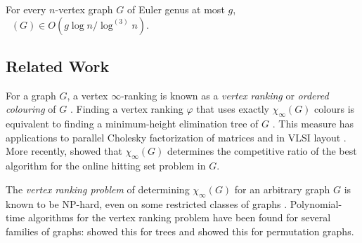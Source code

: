 \documentclass[kpfonts]{patmorin}
\DeclareMathOperator{\trn}{\chi_2}
\theoremstyle{named}
\begin{document}
\begin{thm}\label{bounded-genus}
    For every $n$-vertex graph $G$ of Euler genus at most $g$, $\trn(G)\in O(g\log n/\log^{(3)} n)$.
\end{thm}




\subsection{Related Work}

For a graph $G$, a vertex $\infty$-ranking is known as a \emph{vertex ranking} \cite{bodlaender.deogun.ea:rankings} or \emph{ordered colouring} of $G$ \cite{katchalski.mccuaig.ea:ordered}.  Finding a vertex ranking $\varphi$ that uses exactly $\chi_\infty(G)$ colours is equivalent to finding a minimum-height elimination tree of $G$ \cite{torre.greenlaw.ea:optimal,deogun.kloks.ea:on}.  This measure has applications to parallel Cholesky factorization of matrices \cite{bodlaender.gilbert.ea:approximating,duff.reid:multifrontal,liu:role,dereniowski.kubale:cholesky} and in VLSI layout \cite{leiserson:area,sen.deng.ea:on}.  More recently, \citet{even.smorodinsky:hitting} showed that $\chi_\infty(G)$ determines the competitive ratio of the best algorithm for the online hitting set problem in $G$.

The \emph{vertex ranking problem} of determining $\chi_\infty(G)$ for an arbitrary graph $G$ is known to be NP-hard, even on some restricted classes of graphs \cite{bodlaender.deogun.ea:rankings,llewellyn.tovey.ea:local,llewellyn.tovey.ea:erratum,dereniowski.nadolski:vertex}. Polynomial-time algorithms for the vertex ranking problem have been found for several families of graphs: \citet{schaeffer:optimal} showed this for trees and \citet{deogun.kloks.ea:on} showed this for permutation graphs.
\end{document}
